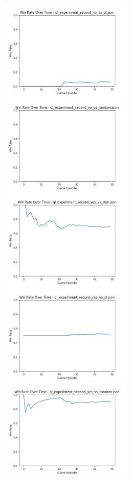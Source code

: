 \includegraphics[width=0.5\textwidth]{images/win_rate_ql_experiment_second_no_vs_ql.png} 
\includegraphics[width=0.5\textwidth]{images/win_rate_ql_experiment_second_no_vs_random.png} 
\includegraphics[width=0.5\textwidth]{images/win_rate_ql_experiment_second_yes_vs_dqn.png} 
\includegraphics[width=0.5\textwidth]{images/win_rate_ql_experiment_second_yes_vs_ql.png} 
\includegraphics[width=0.5\textwidth]{images/win_rate_ql_experiment_second_yes_vs_random.png} 

